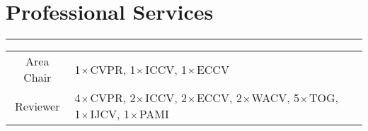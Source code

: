 \documentclass[10pt]{article}
\begin{document}
\section*{Professional Services}
\vspace{-0.3cm}
{\color{E6E6E6} \hrule height 0.04cm}
\vspace{0.4cm}
\renewcommand{\arraystretch}{1.0}
\begin{tabular}{C Z >{\setlength{\baselineskip}{0.9\baselineskip}}D}
	{
		Area Chair
	}
	&
	{
		{1$\hspace{0.02cm}\times\hspace{0.02cm}$CVPR, 1$\hspace{0.02cm}\times\hspace{0.02cm}$ICCV, 1$\hspace{0.02cm}\times\hspace{0.02cm}$ECCV}

		\vspace{0.0cm}
	}
	\\
	{
		Reviewer
	}
	&
	{
		{4$\hspace{0.02cm}\times\hspace{0.02cm}$CVPR, 2$\hspace{0.02cm}\times\hspace{0.02cm}$ICCV, 2$\hspace{0.02cm}\times\hspace{0.02cm}$ECCV, 2$\hspace{0.02cm}\times\hspace{0.02cm}$WACV, 5$\hspace{0.02cm}\times\hspace{0.02cm}$TOG, 1$\hspace{0.02cm}\times\hspace{0.02cm}$IJCV, 1$\hspace{0.02cm}\times\hspace{0.02cm}$PAMI}
	}
	\\
\end{tabular}
\end{document}
